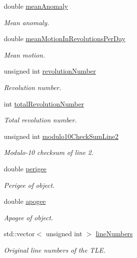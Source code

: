 \begin{DoxyCompactItemize}
double \hyperlink{structtudat_1_1input__output_1_1TwoLineElementData_abb5a27435eb2fcefd5fab5d3d0455a70}{mean\+Anomaly}
\begin{DoxyCompactList}\small\item\em Mean anomaly. \end{DoxyCompactList}\item 
double \hyperlink{structtudat_1_1input__output_1_1TwoLineElementData_a15ed418187dcd128fc66c6dfd244a2df}{mean\+Motion\+In\+Revolutions\+Per\+Day}
\begin{DoxyCompactList}\small\item\em Mean motion. \end{DoxyCompactList}\item 
unsigned int \hyperlink{structtudat_1_1input__output_1_1TwoLineElementData_a9bba8e2d2e612bc069ed26f77740ea3e}{revolution\+Number}
\begin{DoxyCompactList}\small\item\em Revolution number. \end{DoxyCompactList}\item 
int \hyperlink{structtudat_1_1input__output_1_1TwoLineElementData_a6c11f81942e88be63786236eb39805a2}{total\+Revolution\+Number}
\begin{DoxyCompactList}\small\item\em Total revolution number. \end{DoxyCompactList}\item 
unsigned int \hyperlink{structtudat_1_1input__output_1_1TwoLineElementData_a77315b4c45af60560bf32c182189f297}{modulo10\+Check\+Sum\+Line2}
\begin{DoxyCompactList}\small\item\em Modulo-\/10 checksum of line 2. \end{DoxyCompactList}\item 
double \hyperlink{structtudat_1_1input__output_1_1TwoLineElementData_a9e2c17476a8256d1298e994dd20a236f}{perigee}
\begin{DoxyCompactList}\small\item\em Perigee of object. \end{DoxyCompactList}\item 
double \hyperlink{structtudat_1_1input__output_1_1TwoLineElementData_a9185be3843e087ee9aa9fe3af0fc6e1a}{apogee}
\begin{DoxyCompactList}\small\item\em Apogee of object. \end{DoxyCompactList}\item 
std\+::vector$<$ unsigned int $>$ \hyperlink{structtudat_1_1input__output_1_1TwoLineElementData_afbbc6c45454595ec579db0ea0b490206}{line\+Numbers}
\begin{DoxyCompactList}\small\item\em Original line numbers of the T\+LE. \end{DoxyCompactList}\end{DoxyCompactItemize}
